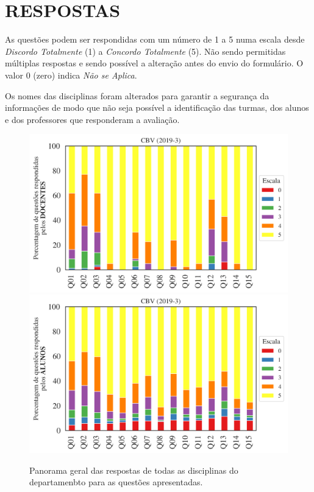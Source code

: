 \documentclass[a4paper,10pt]{article}
\begin{document}
\section{RESPOSTAS}
As questões podem ser respondidas com um número de 1 a 5 numa escala desde {\it Discordo Totalmente} (1) a {\it Concordo Totalmente} (5). Não sendo permitidas múltiplas respostas e sendo possível a alteração antes do envio do formulário. O valor 0 (zero) indica {\it Não se Aplica}.

Os nomes das disciplinas foram alterados para garantir a segurança da informações de modo que não seja possível a identificação das turmas, dos alunos  e dos professores que responderam a avaliação.

\begin{figure}[h]
\centering
\includegraphics[width=0.85\linewidth]{analise_geral_departamento_CBV_docentes.png}
\includegraphics[width=0.85\linewidth]{analise_geral_departamento_CBV_alunos.png}
\caption{\label{fig:analise_geral_departamento}            Panorama geral das respostas de todas as  disciplinas do departamenbto para as questões apresentadas.}
\end{figure}
\end{document}

